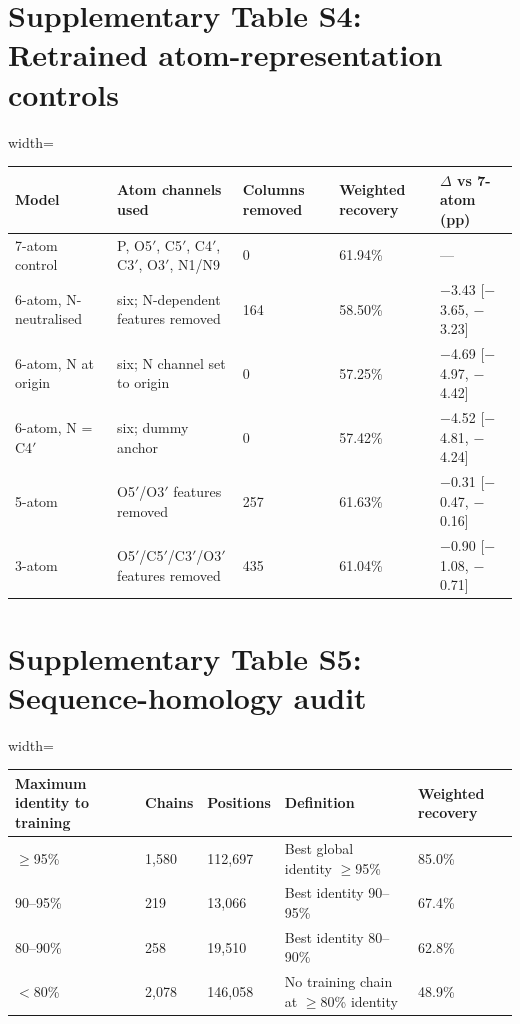 \documentclass[pdflatex,sn-nature]{sn-jnl}
\begin{document}
\clearpage
\section*{Supplementary Table S4: Retrained atom-representation controls}

\begingroup\footnotesize
\begin{adjustbox}{width=\textwidth}
\begin{tabular}{p{}p{}p{}p{}p{}}
\toprule
Model & Atom channels used & Columns removed & Weighted recovery & $\Delta$ vs 7-atom (pp) \\
\midrule
7-atom control & P, O5$'$, C5$'$, C4$'$, C3$'$, O3$'$, N1/N9 & 0 & 61.94\% & --- \\
6-atom, N-neutralised & six; N-dependent features removed & 164 & 58.50\% & $-$3.43 [$-$3.65, $-$3.23] \\
6-atom, N at origin & six; N channel set to origin & 0 & 57.25\% & $-$4.69 [$-$4.97, $-$4.42] \\
6-atom, N = C4$'$ & six; dummy anchor & 0 & 57.42\% & $-$4.52 [$-$4.81, $-$4.24] \\
5-atom & O5$'$/O3$'$ features removed & 257 & 61.63\% & $-$0.31 [$-$0.47, $-$0.16] \\
3-atom & O5$'$/C5$'$/C3$'$/O3$'$ features removed & 435 & 61.04\% & $-$0.90 [$-$1.08, $-$0.71] \\
\bottomrule
\end{tabular}
\end{adjustbox}
\endgroup

\section*{Supplementary Table S5: Sequence-homology audit}

\begingroup\footnotesize
\begin{adjustbox}{width=\textwidth}
\begin{tabular}{p{}p{}p{}p{}p{}}
\toprule
Maximum identity to training & Chains & Positions & Definition & Weighted recovery \\
\midrule
$\geq$95\% & 1,580 & 112,697 & Best global identity $\geq$95\% & 85.0\% \\
90--95\% & 219 & 13,066 & Best identity 90--95\% & 67.4\% \\
80--90\% & 258 & 19,510 & Best identity 80--90\% & 62.8\% \\
$<$80\% & 2,078 & 146,058 & No training chain at $\geq$80\% identity & 48.9\% \\
\bottomrule
\end{tabular}
\end{adjustbox}
\endgroup
\end{document}
